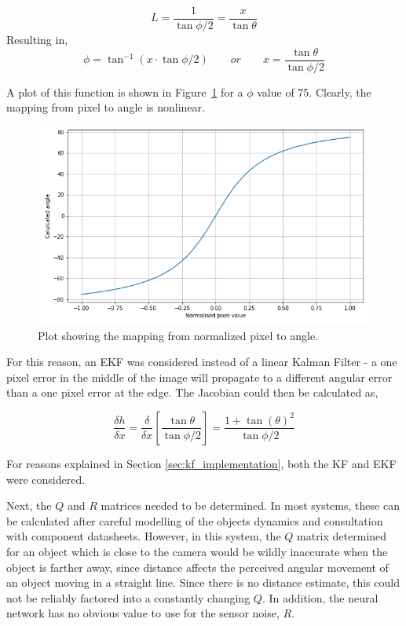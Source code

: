 \[ L = \frac{1}{\tan{\phi/2}} = \frac{x}{\tan{\theta}} \]
Resulting in,
\[ \phi = \tan^{-1}{\left( x\cdot{}\tan{ \phi/2 } \right) }
\qquad or
\qquad x = \frac{\tan{\theta}}{\tan{\phi/2}} \]

A plot of this function is shown in Figure~\ref{fig:pixel_to_angle_plot} for a $\phi$ value of 75\textdegree. Clearly, the mapping from pixel to angle is nonlinear.

\begin{figure}[h!]
  \centering
  \includegraphics[width=\textwidth]{methodology/pixel_to_angle_plot}
  \caption{\label{fig:pixel_to_angle_plot}Plot showing the mapping from normalized pixel to angle.}
\end{figure}

For this reason, an EKF was considered instead of a linear Kalman Filter - a one pixel error in the middle of the image will propagate to a different angular error than a one pixel error at the edge. The Jacobian could then be calculated as,

\[ \frac{\delta h}{\delta x} = \frac{\delta}{\delta x} \left[ \frac{\tan{\theta}}{\tan{\phi/2}} \right] = \frac{1 + \tan{(\theta)}^2}{\tan{\phi/2}} \]

For reasons explained in Section \ref{sec:kf_implementation}, both the KF and EKF were considered.

Next, the $Q$ and $R$ matrices needed to be determined. In most systems, these can be calculated after careful modelling of the objects dynamics and consultation with component datasheets. However, in this system, the $Q$ matrix determined for an object which is close to the camera would be wildly inaccurate when the object is farther away, since distance affects the perceived angular movement of an object moving in a straight line. Since there is no distance estimate, this could not be reliably factored into a constantly changing $Q$. In addition, the neural network has no obvious value to use for the sensor noise, $R$.

